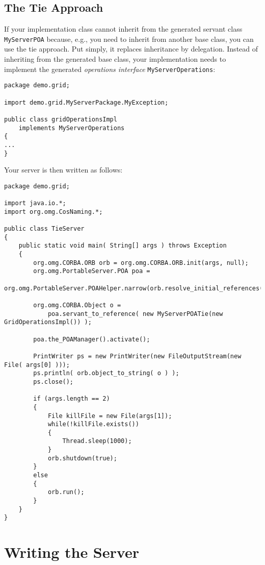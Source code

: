 \subsection{The Tie Approach}

If your implementation class cannot inherit from the generated servant
class  {\tt  MyServerPOA} because,  e.g.,  you  need  to inherit  from
another  base class,  you can  use the  tie approach.  Put  simply, it
replaces  inheritance by  delegation. Instead  of inheriting  from the
generated  base  class, your  implementation  needs  to implement  the
generated {\em operations interface} {\tt MyServerOperations}:

\begin{verbatim}
package demo.grid;

import demo.grid.MyServerPackage.MyException;

public class gridOperationsImpl
    implements MyServerOperations
{
...
}
\end{verbatim}

Your server is then written as follows:

\begin{verbatim}
package demo.grid;

import java.io.*;
import org.omg.CosNaming.*;

public class TieServer
{
    public static void main( String[] args ) throws Exception
    {
        org.omg.CORBA.ORB orb = org.omg.CORBA.ORB.init(args, null);
        org.omg.PortableServer.POA poa =
            org.omg.PortableServer.POAHelper.narrow(orb.resolve_initial_references("RootPOA"));

        org.omg.CORBA.Object o =
            poa.servant_to_reference( new MyServerPOATie(new GridOperationsImpl()) );

        poa.the_POAManager().activate();

        PrintWriter ps = new PrintWriter(new FileOutputStream(new File( args[0] )));
        ps.println( orb.object_to_string( o ) );
        ps.close();

        if (args.length == 2)
        {
            File killFile = new File(args[1]);
            while(!killFile.exists())
            {
                Thread.sleep(1000);
            }
            orb.shutdown(true);
        }
        else
        {
            orb.run();
        }
    }
}
\end{verbatim}


\section{Writing the Server}

